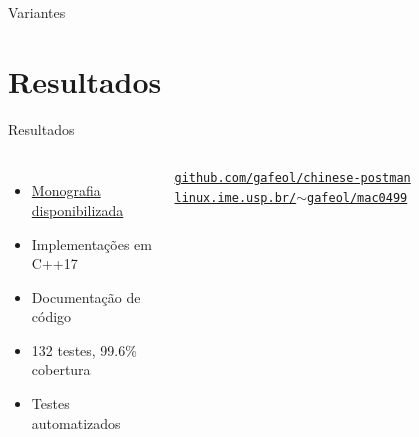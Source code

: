 \documentclass{beamer}
\begin{document}
\begin{frame}{Variantes}
        \vspace{5px}


\end{frame}
\section{Resultados}

\begin{frame}{Resultados}
    \begin{columns}
        \begin{itemize}
            \item \href{https://www.linux.ime.usp.br/~gafeol/mac0499/chinese-postman/tex/main.pdf}{Monografia disponibilizada}
            \item Implementações em C++17
            \item Documentação de código
            \item 132 testes, 99.6\% cobertura
            \item Testes automatizados
        \end{itemize} 

        \vspace{5px}

        \begin{center}
            \href{https://github.com/gafeol/chinese-postman}{\texttt{github.com/gafeol/chinese-postman}}
            \href{https://www.linux.ime.usp.br/~gafeol/mac0499/}{\texttt{linux.ime.usp.br/$\sim$gafeol/mac0499}}
            
        \end{center}



\end{columns}
\end{frame}
\end{document}
